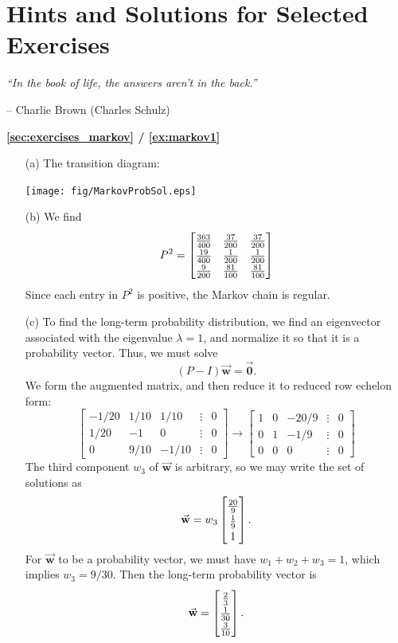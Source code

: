 \documentclass[reqno]{immbook}
\newcommand{\BW}{\vec{\textbf{w}}}
\newcommand{\BZero}{\vec{\textbf{0}}}  %
\newcommand{\T}{\rule{0pt}{2.6ex}}
\newcommand{\B}{\rule[-1.2ex]{0pt}{0pt}}
\numberwithin{equation}{chapter}
\numberwithin{question}{section}
\numberwithin{theorem}{chapter}
\numberwithin{figure}{chapter}
\theoremstyle{definition}
\begin{document}
\chapter[Hints and Solutions]{Hints and Solutions for Selected Exercises}

\noindent
\emph{``In the book of life, the answers aren't in the back.''}

\hfill        -- Charlie Brown (Charles Schulz)

\bigskip
\textbf{\ref{sec:exercises_markov} / \ref{ex:markov1}}
\begin{enumerate}
\item[(a)] The transition diagram:

\medskip
\centerline{%
\texttt{[image: fig/MarkovProbSol.eps]}
}
\medskip

\item[(b)]
We find
\[
  P ^2= \begin{bmatrix}
           \frac{363}{400} & \frac{37}{200} & \frac{37}{200} \T\B \\
	   \frac{19}{400} & \frac{1}{200}   & \frac{1}{200} \B  \\
	   \frac{9}{200}    & \frac{81}{100} & \frac{81}{100} \B
      \end{bmatrix}
\]
Since each entry in $P^2$ is positive, the Markov chain is regular.
\item[(c)]
To find the long-term probability distribution, we find an eigenvector
associated with the eigenvalue $\lambda=1$, and normalize it so that
it is a probability vector.
Thus, we must solve
\[
  (P-I)\BW = \BZero.
\]
We form the augmented matrix,
and then reduce it to reduced row echelon form:
\[
\begin{bmatrix}
   -1/20 & 1/10 & 1/10 & \vdots & 0 \\
   1/20  &   -1  &  0   & \vdots & 0 \\
   0     &  9/10 & -1/10 & \vdots & 0
\end{bmatrix}
\rightarrow
\begin{bmatrix}
   1  &   0  & -20/9  & \vdots & 0 \\
   0  &   1  & -1/9   & \vdots & 0 \\
   0  &   0  &  0     & \vdots & 0
\end{bmatrix}
\]
The third component $w_3$ of $\BW$ is arbitrary, so we may write
the set of solutions as
\[
   \BW = w_3 \begin{bmatrix}
               \frac{20}{9} \T\B \\ \frac{1}{9} \B\\ 1
             \end{bmatrix} .
\]
For $\BW$ to be a probability vector, we must have $w_1+w_2+w_3=1$,
which implies $w_3 = 9/30$.  Then the long-term probability vector
is
\[
  \BW = \begin{bmatrix}
          \frac{2}{3} \T\B \\ \frac{1}{30} \B \\ \frac{3}{10} \B
        \end{bmatrix} .
\]
\end{enumerate}
\end{document}
